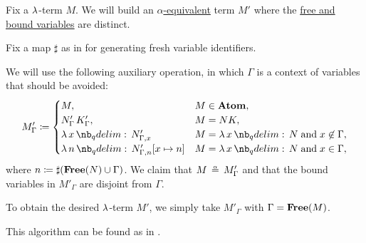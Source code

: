 \begin{algorithm}\label{alg:separation_of_free_and_bound_variables}
  Fix a \( \mathrm{\lambda} \)-term \( M \). We will build an \hyperref[def:lambda_term_alpha_equivalence]{\( \alpha \)-equivalent} term \( M' \) where the \hyperref[def:lambda_variable_freeness]{free and bound variables} are distinct.

  Fix a map \( \sharp \) as in  for generating fresh variable identifiers.

  We will use the following auxiliary operation, in which \( \Gamma \) is a context of variables that should be avoided:
  \begin{equation*}
    M'_\Gamma \coloneqq \begin{cases}
      M,                                 &M \in \op*{Atom}, \\
      N'_\Gamma \thinspace K'_\Gamma,    &M = NK, \\
      \qabs x N'_{\Gamma,x}              &M = \qabs x N \T{and} x \not\in \Gamma, \\
      \qabs n N'_{\Gamma,n}[x \mapsto n] &M = \qabs x N \T{and} x \in \Gamma,
    \end{cases}
  \end{equation*}
  where \( n \coloneqq \sharp(\op*{Free}(N) \cup \Gamma) \). We claim that \( M \aequiv M'_\Gamma \) and that the bound variables in \( M'_\Gamma \) are disjoint from \( \Gamma \).

  To obtain the desired \( \mathrm{\lambda} \)-term \( M' \), we simply take \( M'_\Gamma \) with \( \Gamma = \op*{Free}(M) \).
\end{algorithm}
\begin{comments}
  \item This algorithm can be found as  in \cite{notebook:code}.
\end{comments}
